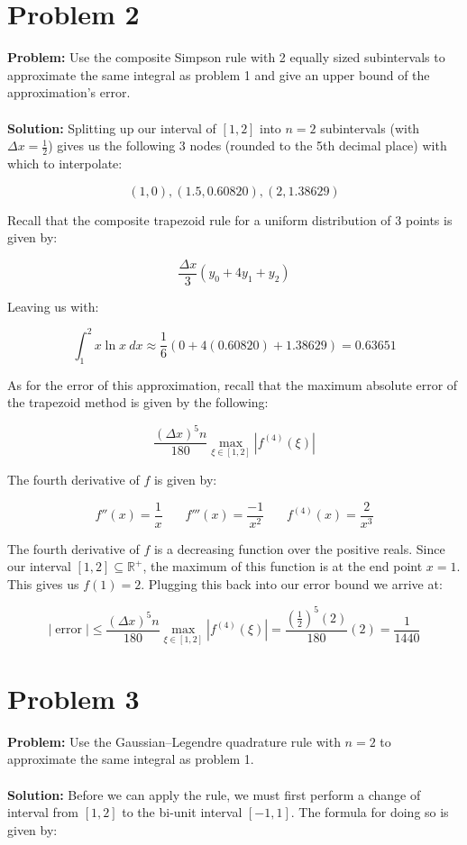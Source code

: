 \documentclass{article}
\begin{document}
\section*{Problem 2}
\textbf{Problem:} Use the composite Simpson rule with 2 equally sized subintervals to approximate the same integral as problem 1 and give an upper bound of the approximation's error.
\\\\
\textbf{Solution:} Splitting up our interval of $[1,2]$ into $n=2$ subintervals (with $\Delta x =\frac{1}{2}$) gives us the following 3 nodes (rounded to the 5th decimal place) with which to interpolate:

$$\left(1,0\right), \left(1.5,0.60820\right), \left(2,1.38629\right)$$

Recall that the composite trapezoid rule for a uniform distribution of 3 points is given by:

$$\frac{\Delta x}{3}\left(y_0+4y_1+y_2\right)$$

Leaving us with:

$$\int^2_1 x\ln x\ dx\approx\frac{1}{6}\left(0+4(0.60820)+1.38629\right)=\boxed{0.63651}$$

As for the error of this approximation, recall that the maximum absolute error of the trapezoid method is given by the following:

$$\frac{(\Delta x)^5n}{180}\max_{\xi\in[1,2]}|f^{(4)}(\xi)|$$

The fourth derivative of $f$ is given by:

$$f''(x)=\frac{1}{x}\ \ \ \ \ \ \ \  f'''(x)=\frac{-1}{x^2}\ \ \ \ \ \ \ \  f^{(4)}(x)=\frac{2}{x^3}$$

The fourth derivative of $f$ is a decreasing function over the positive reals. Since our interval $[1,2]\subseteq\mathbb R^+$, the maximum of this function is at the end point $x=1$. This gives us $f(1)=2$. Plugging this back into our error bound we arrive at:

$$|\operatorname{error}|\le \frac{(\Delta x)^5n}{180}\max_{\xi\in[1,2]}|f^{(4)}(\xi)|=\frac{\left(\frac{1}{2}\right)^5(2)}{180}(2)=\boxed{\frac{1}{1440}}$$

\section*{Problem 3}
\textbf{Problem:} Use the Gaussian–Legendre quadrature rule with $n=2$ to approximate the same integral as problem 1.
\\\\
\textbf{Solution:} Before we can apply the rule, we must first perform a change of interval from $[1,2]$ to the bi-unit interval $[-1,1]$. The formula for doing so is given by:
\end{document}
